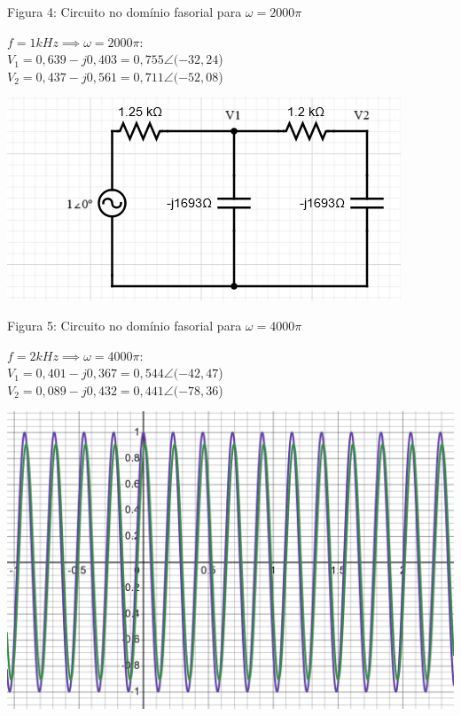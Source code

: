 \documentclass[a4 paper]{article}
\begin{document}
\begin{center}
Figura 4: Circuito no domínio fasorial para $\omega=2000\pi$
\end{center}

$f=1kHz\implies \omega = 2000\pi:$\\\centering
$V_1=0,639-j0,403=0,755\angle(-32,24$\textdegree)\\
$V_2=0,437-j0,561=0,711\angle(-52,08$\textdegree)\\
\justifying

\begin{table}[h]
\centering
\includegraphics[scale=0.6]{figuras/figura5}
\end{table}

\begin{center}
Figura 5: Circuito no domínio fasorial para $\omega=4000\pi$
\end{center}

$f=2kHz\implies \omega = 4000\pi:$\\\centering
$V_1=0,401-j0,367=0,544\angle(-42,47$\textdegree)\\
$V_2=0,089-j0,432=0,441\angle(-78,36$\textdegree)\\
\justifying

\newpage
\begin{table}[h]
\centering
\includegraphics[scale=0.25]{rgadicoas/grafico2}
\end{table}
\end{document}

